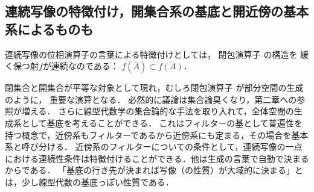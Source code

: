 \documentclass[uplatex,dvipdfmx]{jsreport}
\begin{document}
\subsection{連続写像の特徴付け，開集合系の基底と開近傍の基本系によるものも}

\begin{screen}
    連続写像の位相演算子の言葉による特徴付けとしては，
    閉包演算子$\overline{ }$の構造を
    緩く保つ射$f$が連続なのである：
    $f(\overline{A})\subset\overline{f(A)}$．
    
    閉集合と開集合が平等な対象として現れ，むしろ閉包演算子$\overline{ }$が部分空間の生成のように，
    重要な演算となる．
    必然的に議論は集合論臭くなり，第二章への参照が増える．
    さらに線型代数学の集合論的な手法を取り入れて，全体空間の生成系として基底を考えることができる．
    これはフィルターの基として普遍性を持つ概念で，近傍系もフィルターであるから近傍系にも定まる，その場合を基本系と呼び分ける．
    近傍系のフィルターについての条件として，連続写像の一点における連続性条件は特徴付けることができる．他は生成の言葉で自動で決まるからである．
    「基底の行き先が決まれば写像（の性質）が大域的に決まる」とは，少し線型代数の基底っぽい性質である．
\end{screen}
\end{document}
